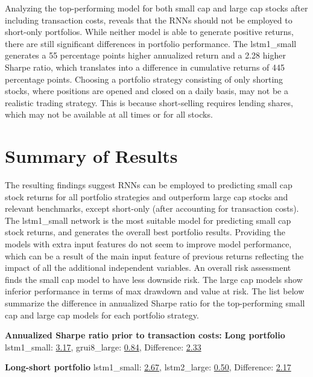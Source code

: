 \indent\newline 
Analyzing the top-performing model for both small cap and large cap stocks after including transaction costs, reveals that the RNNs should not be employed to short-only portfolios. While neither model is able to generate positive returns, there are still significant differences in portfolio performance. The lstm1\_small generates a 55 percentage points higher annualized return and a 2.28 higher Sharpe ratio, which translates into a difference in cumulative returns of 445 percentage points. Choosing a portfolio strategy consisting of only shorting stocks, where positions are opened and closed on a daily basis, may not be a realistic trading strategy. This is because short-selling requires lending shares, which may not be available at all times or for all stocks. 

\section{Summary of Results}
The resulting findings suggest RNNs can be employed to predicting small cap stock returns for all portfolio strategies and outperform large cap stocks and relevant benchmarks, except short-only (after accounting for transaction costs). The lstm1\_small network is the most suitable model for predicting small cap stock returns, and generates the overall best portfolio results. Providing the models with extra input features do not seem to improve model performance, which can be a result of the main input feature of previous returns reflecting the impact of all the additional independent variables. An overall risk assessment finds the small cap model to have less downside risk. The large cap models show inferior performance in terms of max drawdown and value at risk. The list below summarize the difference in annualized Sharpe ratio for the top-performing small cap and large cap models for each portfolio strategy.

\indent\newline
\textbf{Annualized Sharpe ratio prior to transaction costs:}
\indent\newline
\textbf{Long portfolio} 
\indent\newline
lstm1\_small: \underline{3.17},  grui8\_large: \underline{0.84},  Difference: \underline{2.33}

\indent\newline
\textbf{Long-short portfolio} 
\indent\newline
lstm1\_small: \underline{2.67},  lstm2\_large: \underline{0.50},  Difference:  \underline{2.17}  

